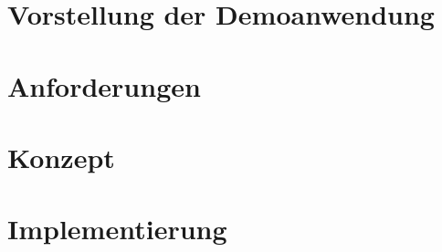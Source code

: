 	
\section{Vorstellung der Demoanwendung}


\vspace{-0.5\baselineskip}
	
\section{Anforderungen}

	
\section{Konzept}


\section{Implementierung}

